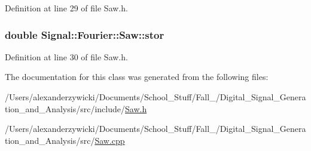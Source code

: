 Definition at line 29 of file Saw.\+h.

\hypertarget{classSignal_1_1Fourier_1_1Saw_a31859d02406add22e072936c33f386af}{
\subsubsection[{stor}]{\setlength{\rightskip}{0pt plus 5cm}double Signal\+::\+Fourier\+::\+Saw\+::stor\hspace{0.3cm}{\ttfamily [protected]}}}\label{classSignal_1_1Fourier_1_1Saw_a31859d02406add22e072936c33f386af}


Definition at line 30 of file Saw.\+h.



The documentation for this class was generated from the following files\+:\begin{DoxyCompactItemize}
\item 
/\+Users/alexanderzywicki/\+Documents/\+School\+\_\+\+Stuff/\+Fall\+\_/\+Digital\+\_\+\+Signal\+\_\+\+Generation\+\_\+and\+\_\+\+Analysis/src/include/\hyperlink{Saw_8h}{Saw.\+h}\item 
/\+Users/alexanderzywicki/\+Documents/\+School\+\_\+\+Stuff/\+Fall\+\_/\+Digital\+\_\+\+Signal\+\_\+\+Generation\+\_\+and\+\_\+\+Analysis/src/\hyperlink{Saw_8cpp}{Saw.\+cpp}\end{DoxyCompactItemize}
